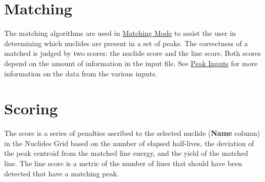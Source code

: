 \documentclass[12pt,report,justified]{SANDreport}
\begin{document}
      \section{Matching} \label{sec:match}
The matching algorithms are used in \hyperref[sec:match_mode]{Matching Mode} to assist the user in 
determining which nuclides are present in a set of peaks. The correctness of a matched is judged by 
two scores: the nuclide score and the line score. Both scores depend on the amount of information 
in the input file. See \hyperref[sec:peak_inp]{Peak Inputs} for more information on the data from the 
various inputs.

      \section{Scoring} \label{sec:score}
The score is a series of penalties ascribed to the selected nuclide (\textbf{Name} column) in the Nuclides
Grid based on the number of elapsed half-lives, the deviation of the peak centroid from the matched
line energy, and the yield of the matched line. The line score is a metric of the number of lines
that should have been detected that have a matching peak.
\end{document}
